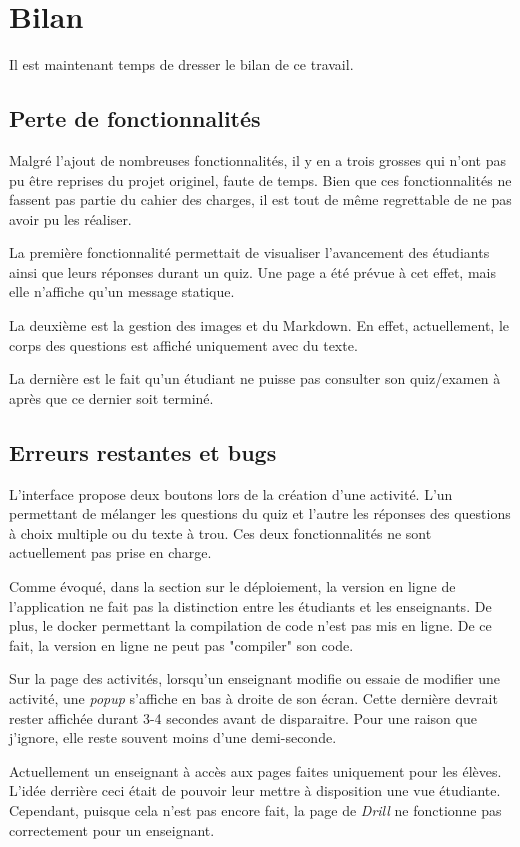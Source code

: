 \section{Bilan}
Il est maintenant temps de dresser le bilan de ce travail.
\subsection{Perte de fonctionnalités}
Malgré l'ajout de nombreuses fonctionnalités, il y en a trois grosses qui n'ont pas pu être reprises du projet originel, faute de temps. Bien que ces fonctionnalités ne fassent pas partie du cahier des charges, il est tout de même regrettable de ne pas avoir pu les réaliser.

La première fonctionnalité permettait de visualiser l'avancement des étudiants ainsi que leurs réponses durant un quiz. Une page a été prévue à cet effet, mais elle n'affiche qu'un message statique.

La deuxième est la gestion des images et du Markdown. En effet, actuellement, le corps des questions est affiché uniquement avec du texte.

La dernière est le fait qu'un étudiant ne puisse pas consulter son quiz/examen à après que ce dernier soit terminé.

\subsection{Erreurs restantes et bugs}
L'interface propose deux boutons lors de la création d'une activité. L'un permettant de mélanger les questions du quiz et l'autre les réponses des questions à choix multiple ou du texte à trou. Ces deux fonctionnalités ne sont actuellement pas prise en charge.

Comme évoqué, dans la section sur le déploiement, la version en ligne de l'application ne fait pas la distinction entre les étudiants et les enseignants. De plus, le docker permettant la compilation de code n'est pas mis en ligne. De ce fait, la version en ligne ne peut pas "compiler" son code.

Sur la page des activités, lorsqu'un enseignant modifie ou essaie de modifier une activité, une \emph{popup} s'affiche en bas à droite de son écran. Cette dernière devrait rester affichée durant 3-4 secondes avant de disparaitre. Pour une raison que j'ignore, elle reste souvent moins d'une demi-seconde.

Actuellement un enseignant à accès aux pages faites uniquement pour les élèves. L'idée derrière ceci était de pouvoir leur mettre à disposition une vue étudiante. Cependant, puisque cela n'est pas encore fait, la page de \emph{Drill} ne fonctionne pas correctement pour un enseignant.

